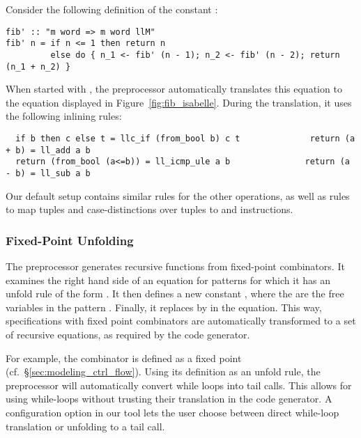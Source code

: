\documentclass[a4paper,USenglish,cleveref, autoref]{lipics-v2019}
\begin{document}
\begin{example}
Consider the following definition of the constant :
\begin{lstlisting}
fib' :: "m word => m word llM"
fib' n = if n <= 1 then return n 
         else do { n_1 <- fib' (n - 1); n_2 <- fib' (n - 2); return (n_1 + n_2) }
\end{lstlisting}
When started with , the preprocessor automatically translates this equation 
to the equation displayed in Figure~\ref{fig:fib_isabelle}. During the translation, it uses the following inlining rules:
\begin{lstlisting}
  if b then c else t = llc_if (from_bool b) c t              return (a + b) = ll_add a b
  return (from_bool (a<=b)) = ll_icmp_ule a b               return (a - b) = ll_sub a b
\end{lstlisting}
Our default setup contains similar rules for the other operations, as well as rules to map tuples and case-distinctions over tuples to  and  instructions.
\end{example}

\subsubsection{Fixed-Point Unfolding}
The preprocessor generates recursive functions from fixed-point combinators. 
It examines the right hand side of an equation for patterns  for which it has an unfold rule of the form .
It then defines a new constant , where the  are the free variables in the pattern .
Finally, it replaces  by  in the equation. This way, specifications with fixed point combinators are automatically 
transformed to a set of recursive equations, as required by the code generator.

For example, the  combinator is defined as a fixed point (cf.~\S\ref{sec:modeling_ctrl_flow}). 
Using its definition as an unfold rule, the preprocessor will automatically convert while loops into tail calls.
This allows for using while-loops without trusting their translation in the code generator. 
A configuration option in our tool lets the user choose between direct while-loop translation or unfolding to a tail call.
\end{document}
